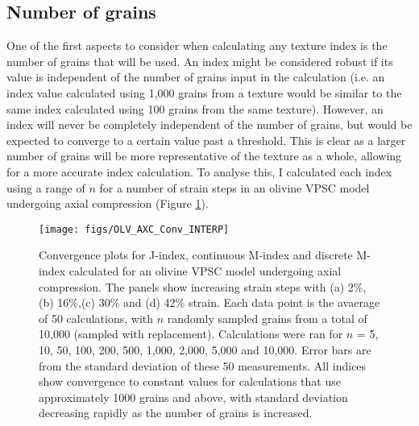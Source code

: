\documentclass[a4paper,12pt,twoside]{report}
\numberwithin{equation}{chapter}
\begin{document}
\subsection{Number of grains} \label{sec:no_grains_analysis}

One of the first aspects to consider when calculating any texture index is the number of grains that will be used. An index might be considered robust if its value is independent of the number of grains input in the calculation (i.e. an index value calculated using 1,000 grains from a texture would be similar to the same index calculated using 100 grains from the same texture). However, an index will never be completely independent of the number of grains, but would be expected to converge to a certain value past a threshold. This is clear as a larger number of grains will be more representative of the texture as a whole, allowing for a more accurate index calculation. To analyse this, I calculated each index using a range of $n$ for a number of strain steps in an olivine VPSC model undergoing axial compression (Figure \ref{fig:OLV_AXC_n_conv}). 

\begin{figure}[bht]
  \centering
    \texttt{[image: figs/OLV\_AXC\_Conv\_INTERP]}
  \caption[Convergence with no. grains (olivine VPSC)]{Convergence plots for J-index, continuous M-index and discrete M-index calculated for an olivine VPSC model undergoing axial compression. The panels show increasing strain steps with (a) 2\%, (b) 16\%,(c) 30\% and (d) 42\% strain. Each data point is the avaerage of 50 calculations, with $n$ randomly sampled grains from a total of 10,000 (sampled with replacement). Calculations were ran for $n$ = 5, 10, 50, 100, 200, 500, 1,000, 2,000, 5,000 and 10,000. Error bars are from the standard deviation of these 50 measurements. All indices show convergence to constant values for calculations that use approximately 1000 grains and above, with standard deviation decreasing rapidly as the number of grains is increased.}
  \label{fig:OLV_AXC_n_conv}
\end{figure}
\end{document}

